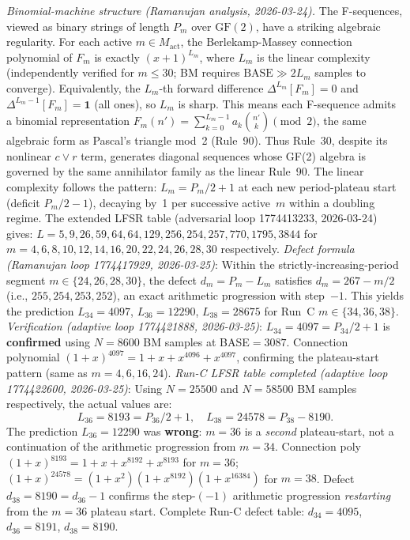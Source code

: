 \documentclass[11pt]{article}
\theoremstyle{plain}
\theoremstyle{definition}
\begin{document}
\emph{Binomial-machine structure (Ramanujan analysis, 2026-03-24).}
The F-sequences, viewed as binary strings of length $P_m$ over $\mathrm{GF}(2)$, have a
striking algebraic regularity.  For each active $m \in M_{\mathrm{act}}$, the
Berlekamp-Massey connection polynomial of $F_m$ is exactly $(x+1)^{L_m}$, where $L_m$
is the linear complexity (independently verified for $m \leq 30$; BM requires
$\mathrm{BASE} \gg 2L_m$ samples to converge).  Equivalently, the $L_m$-th forward
difference $\Delta^{L_m}[F_m] = 0$ and $\Delta^{L_m-1}[F_m] = \mathbf{1}$ (all ones),
so $L_m$ is sharp.  This means each F-sequence admits a binomial representation
$F_m(n') = \sum_{k=0}^{L_m-1} a_k \binom{n'}{k} \pmod{2}$,
the same algebraic form as Pascal's triangle mod~2 (Rule~90).  Thus Rule~30, despite its
nonlinear $c \vee r$ term, generates diagonal sequences whose GF(2) algebra is governed
by the same annihilator family as the linear Rule~90.  The linear complexity follows the
pattern: $L_m = P_m/2 + 1$ at each new period-plateau start (deficit $P_m/2 - 1$),
decaying by~1 per successive active~$m$ within a doubling regime.
The extended LFSR table (adversarial loop 1774413233, 2026-03-24) gives:
$L=5,9,26,59,64,64,129,256,254,257,770,1795,3844$ for
$m=4,6,8,10,12,14,16,20,22,24,26,28,30$ respectively.
\emph{Defect formula (Ramanujan loop 1774417929, 2026-03-25)}: Within the strictly-increasing-period
segment $m\in\{24,26,28,30\}$, the defect $d_m = P_m - L_m$ satisfies $d_m = 267 - m/2$
(i.e., $255,254,253,252$), an exact arithmetic progression with step~$-1$.  This yields the
prediction $L_{34}=4097$, $L_{36}=12290$, $L_{38}=28675$ for Run~C $m\in\{34,36,38\}$.
\emph{Verification (adaptive loop 1774421888, 2026-03-25)}: $L_{34}=4097=P_{34}/2+1$
is \textbf{confirmed} using $N=8600$ BM samples at BASE$=3087$.
Connection polynomial $(1{+}x)^{4097}=1{+}x{+}x^{4096}{+}x^{4097}$, confirming
the plateau-start pattern (same as $m=4,6,16,24$).
\emph{Run-C LFSR table completed (adaptive loop 1774422600, 2026-03-25)}: Using $N=25500$
and $N=58500$ BM samples respectively, the actual values are:
\[
L_{36} = 8193 = P_{36}/2+1,\quad L_{38} = 24578 = P_{38} - 8190.
\]
The prediction $L_{36}=12290$ was \textbf{wrong}: $m=36$ is a \emph{second} plateau-start,
not a continuation of the arithmetic progression from $m=34$.
Connection poly $(1+x)^{8193}=1+x+x^{8192}+x^{8193}$ for $m=36$;
$(1+x)^{24578}=(1+x^2)(1+x^{8192})(1+x^{16384})$ for $m=38$.
Defect $d_{38}=8190=d_{36}-1$ confirms the step-$(-1)$ arithmetic progression
\emph{restarting} from the $m=36$ plateau start.
Complete Run-C defect table: $d_{34}=4095$, $d_{36}=8191$, $d_{38}=8190$.
\end{document}
